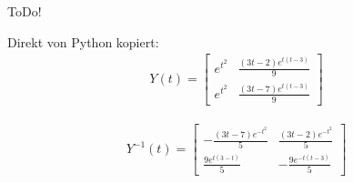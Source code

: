 \begin{exercise}

ToDo!

\end{exercise}

\begin{solution}
    Direkt von Python kopiert:
    \begin{align*}
    Y(t) = \left[\begin{matrix}e^{t^{2}} & \frac{\left(3 t - 2\right) e^{t \left(t - 3\right)}}{9}\\e^{t^{2}} & \frac{\left(3 t - 7\right) e^{t \left(t - 3\right)}}{9}\end{matrix}\right]
    \end{align*}

    \begin{align*}
    Y^{-1}(t) = \left[\begin{matrix}- \frac{\left(3 t - 7\right) e^{- t^{2}}}{5} & \frac{\left(3 t - 2\right) e^{- t^{2}}}{5}\\\frac{9 e^{t \left(3 - t\right)}}{5} & - \frac{9 e^{- t \left(t - 3\right)}}{5}\end{matrix}\right]
    \end{align*}

\end{solution}
